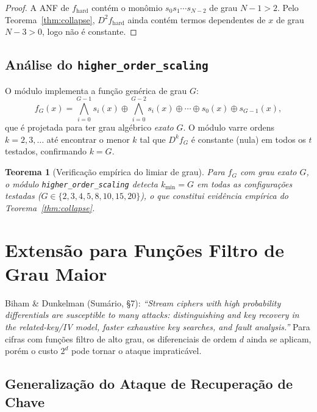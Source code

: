 \documentclass[12pt,a4paper]{article}
\newtheorem{theorem}{Teorema}[section]
\theoremstyle{definition}
\theoremstyle{remark}
\newcommand{\xor}{\oplus}
\newcommand{\filter}{f}
\begin{document}
\begin{proof}
  A ANF de $\filter_{\text{hard}}$ contém o monômio $s_0 s_1 \cdots s_{N-2}$
  de grau $N-1 > 2$. Pelo Teorema~\ref{thm:collapse}, $D^2 \filter_{\text{hard}}$
  ainda contém termos dependentes de $x$ de grau $N-3 > 0$, logo não é constante.
\end{proof}

\subsection{Análise do \texttt{higher\_order\_scaling}}

O módulo implementa a função genérica de grau $G$:
\[
  \filter_G(x) = \bigwedge_{i=0}^{G-1} s_i(x)
                 \xor \bigwedge_{i=0}^{G-2} s_i(x) \xor \cdots \xor s_0(x) \xor s_{G-1}(x),
\]
que é projetada para ter grau algébrico \emph{exato} $G$. O módulo varre
ordens $k = 2, 3, \ldots$ até encontrar o menor $k$ tal que $D^k \filter_G$
é constante (nula) em todos os $t$ testados, confirmando $k = G$.

\begin{theorem}[Verificação empírica do limiar de grau]
  \label{thm:empirical}
  Para $\filter_G$ com grau exato $G$, o módulo \texttt{higher\_order\_scaling}
  detecta $k_{\min} = G$ em todas as configurações testadas
  ($G \in \{2,3,4,5,8,10,15,20\}$), o que constitui evidência empírica
  do Teorema~\ref{thm:collapse}.
\end{theorem}

\section{Extensão para Funções Filtro de Grau Maior}
\label{sec:extension}

\begin{paperref}
  Biham \& Dunkelman (Sumário, \S7): \textit{``Stream ciphers with high
  probability differentials are susceptible to many attacks: distinguishing
  and key recovery in the related-key/IV model, faster exhaustive key
  searches, and fault analysis.''} Para cifras com funções filtro de alto
  grau, os diferenciais de ordem $d$ ainda se aplicam, porém o custo
  $2^d$ pode tornar o ataque impraticável.
\end{paperref}

\subsection{Generalização do Ataque de Recuperação de Chave}
\end{document}
